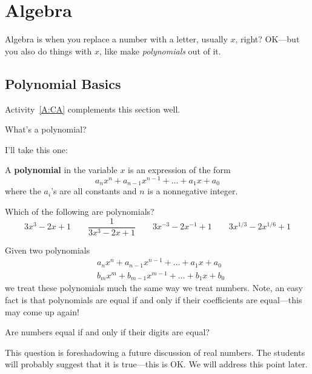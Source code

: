 \section{Algebra}



Algebra is when you replace a number with a letter, usually $x$,
right? OK---but you also do things with $x$, like make
\textit{polynomials} out of it.

\subsection{Polynomial Basics}

\begin{activitynote}
Activity~\ref{A:CA} complements this section well.  %
\end{activitynote}



\begin{question} What's a polynomial? 
\end{question}

I'll take this one:
\begin{definition}
A \textbf{polynomial} in the variable $x$ is an expression of the form
\[
a_nx^n + a_{n-1}x^{n-1} + \dots + a_1 x + a_0
\]
where the $a_i$'s are all constants and $n$ is a nonnegative integer.
\end{definition}

\begin{question}
Which of the following are polynomials?
\[
3x^3 - 2x + 1 \qquad \frac{1}{3x^3 - 2x + 1} \qquad 3x^{-3} - 2x^{-1} + 1 \qquad 3x^{1/3} - 2x^{1/6} + 1
\]
\end{question}
\QM


Given two polynomials
\begin{align*}
&a_nx^n + a_{n-1}x^{n-1} + \dots + a_1 x + a_0 \\
&b_mx^m + b_{m-1}x^{m-1} + \dots + b_1 x + b_0
\end{align*}
we treat these polynomials much the same way we treat numbers. Note,
an easy fact is that polynomials are equal if and only if their
coefficients are equal---this may come up again!

\begin{question} Are numbers equal if and only if their digits are equal?
\end{question}
\QM

\begin{teachingnote}
This question is foreshadowing a future discussion of real numbers. The
students will probably suggest that it is true---this is OK. We will
address this point later.
\end{teachingnote}

